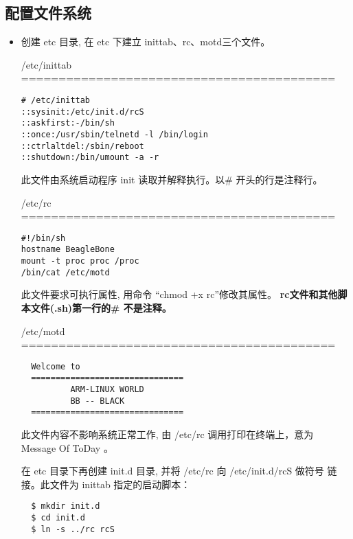 \subsection{配置文件系统}
\begin{itemize}\itemsep=-3pt
  \item 创建 etc 目录, 在 etc 下建立 inittab、rc、motd三个文件。

	/etc/inittab \\ ==========================================

\begin{boxedminipage}{.9\textwidth}
\begin{verbatim}
# /etc/inittab
::sysinit:/etc/init.d/rcS
::askfirst:-/bin/sh
::once:/usr/sbin/telnetd -l /bin/login
::ctrlaltdel:/sbin/reboot
::shutdown:/bin/umount -a -r
\end{verbatim}
\end{boxedminipage}

	此文件由系统启动程序 init 读取并解释执行。以\# 开头的行是注释行。

	/etc/rc \\ ==========================================

\begin{boxedminipage}{.9\textwidth}
\begin{verbatim}
#!/bin/sh
hostname BeagleBone
mount -t proc proc /proc
/bin/cat /etc/motd
\end{verbatim}
\end{boxedminipage}

	此文件要求可执行属性, 用命令 ``chmod +x rc''修改其属性。
{\bf rc文件和其他脚本文件(.sh)第一行的\# 不是注释。}

	/etc/motd \\ ==========================================

\begin{boxedminipage}{.9\textwidth}
\begin{verbatim}
  Welcome to
  ===============================
          ARM-LINUX WORLD
          BB -- BLACK
  ===============================
\end{verbatim}
\end{boxedminipage}

	此文件内容不影响系统正常工作, 由 /etc/rc 调用打印在终端上，意为 Message
Of ToDay 。

	在 etc 目录下再创建 init.d 目录, 并将 /etc/rc 向 /etc/init.d/rcS 做符号
链接。此文件为 inittab 指定的启动脚本：

\begin{boxedminipage}{.9\textwidth}
\begin{verbatim}
  $ mkdir init.d
  $ cd init.d
  $ ln -s ../rc rcS
\end{verbatim}
\end{boxedminipage}


\end{itemize}
